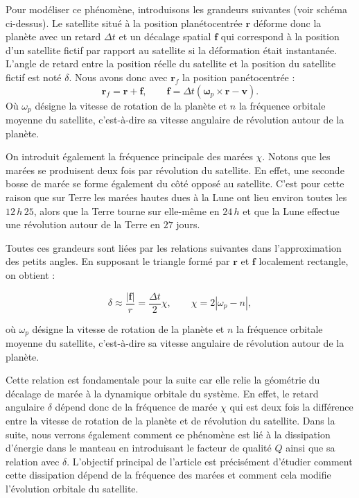 \documentclass[12pt,a4paper]{article}
\begin{document}
	Pour modéliser ce phénomène, introduisons les grandeurs suivantes (voir schéma ci-dessus). Le satellite situé à la position planétocentrée $\mathbf r$ déforme donc la planète avec un retard $\Delta t$ et un décalage spatial $\mathbf f$ qui correspond à la position d'un satellite fictif par rapport au satellite si la déformation était instantanée. L'angle de retard entre la position réelle du satellite et la position du satellite fictif est noté $\delta$. Nous avons donc avec  $\mathbf r_f$ la position panétocentrée  : 
	\[
	\mathbf r_f=\mathbf r+\mathbf f,
	\qquad
	\mathbf f=\Delta t(\boldsymbol{\omega}_p\times\mathbf r-\mathbf v).
	\]
	Où $\omega_p$ désigne la vitesse de rotation de la planète et $n$ la fréquence orbitale moyenne du satellite, c’est-à-dire sa vitesse angulaire de révolution autour de la planète.
	
	On introduit également la fréquence principale des marées $\chi$. Notons que les marées se produisent deux fois par révolution du satellite. En effet, une seconde bosse de marée se forme également du côté opposé au satellite. C’est pour cette raison que sur Terre les marées hautes dues à la Lune ont lieu environ toutes les $12\,h\,25$, alors que la Terre tourne sur elle-même en $24\,h$ et que la Lune effectue une révolution autour de la Terre en  $27$ jours.
	
	Toutes ces grandeurs sont liées par les relations suivantes dans l’approximation des petits angles. En supposant le triangle formé par $\mathbf r$ et $\mathbf f$ localement rectangle, on obtient :
	
	\[
	\delta \approx \frac{|\mathbf f|}{r}
	=
	\frac{\Delta t}{2}\chi,
	\qquad
	\chi = 2|\omega_p-n|,
	\]
	
	où $\omega_p$ désigne la vitesse de rotation de la planète et $n$ la fréquence orbitale moyenne du satellite, c’est-à-dire sa vitesse angulaire de révolution autour de la planète.
	
	Cette relation est fondamentale pour la suite car elle relie la géométrie du décalage  de marée à la dynamique orbitale du système. En effet, le retard angulaire $\delta$ dépend donc de la fréquence de marée $\chi$ qui est deux fois la différence entre la vitesse de rotation de la planète et de révolution du satellite. Dans la suite, nous verrons également comment ce phénomène est lié à la dissipation d’énergie dans le manteau en introduisant le facteur de qualité $Q$ ainsi que sa relation avec  $\delta$. L’objectif principal de l’article est précisément d’étudier comment cette dissipation dépend de la fréquence des marées et comment cela modifie l’évolution orbitale du satellite.
	
\end{document}
